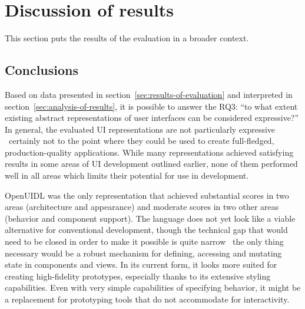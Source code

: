 \section{Discussion of results}\label{sec:evaluation-discussion-of-results}

This section puts the results of the evaluation in a broader context.

\subsection{Conclusions}\label{subsec:conclusions}

Based on data presented in section~\ref{sec:results-of-evaluation} and interpreted in section~\ref{sec:analysis-of-results}, it is possible to answer the RQ3: \enquote{to what extent existing abstract representations of user interfaces can be considered expressive?}
In general, the evaluated UI representations are not particularly expressive \textendash\ certainly not to the point where they could be used to create full-fledged, production-quality applications.
While many representations achieved satisfying results in some areas of UI development outlined earlier, none of them performed well in all areas which limits their potential for use in development.

OpenUIDL was the only representation that achieved substantial scores in two areas (architecture and appearance) and moderate scores in two other areas (behavior and component support).
The language does not yet look like a viable alternative for conventional development, though the technical gap that would need to be closed in order to make it possible is quite narrow \textendash\ the only thing necessary would be a robust mechanism for defining, accessing and mutating state in components and views.
In its current form, it looks more suited for creating high-fidelity prototypes, especially thanks to its extensive styling capabilities.
Even with very simple capabilities of specifying behavior, it might be a replacement for prototyping tools that do not accommodate for interactivity.


